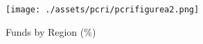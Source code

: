 
\begin{figure}[tb]
    \centering
\texttt{[image: ./assets/pcri/pcrifigurea2.png]}
\caption{Funds by Region (\%)\label{fig:pcrifigurea2}}
\end{figure}
